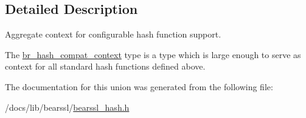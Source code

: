\subsection{Detailed Description}
Aggregate context for configurable hash function support. 

The {\ttfamily \hyperlink{unionbr__hash__compat__context}{br\+\_\+hash\+\_\+compat\+\_\+context}} type is a type which is large enough to serve as context for all standard hash functions defined above. 

The documentation for this union was generated from the following file\+:\begin{DoxyCompactItemize}
\item 
/docs/lib/bearssl/\hyperlink{bearssl__hash_8h}{bearssl\+\_\+hash.\+h}\end{DoxyCompactItemize}
